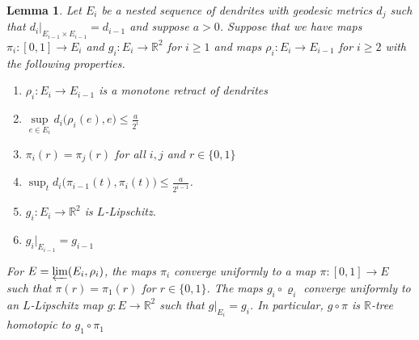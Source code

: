 \documentclass[10pt,a4paper]{amsart}
\newtheorem{lemma}{Lemma}
\begin{document}
\begin{lemma}\label{lem: limit is r-tree homotopic}
Let $E_i$ be a nested sequence of dendrites with geodesic metrics $d_j$ such that $d_{i}|_{E_{i-1}\times E_{i-1}} = d_{i-1}$ and suppose $a>0$. Suppose that we have maps $\pi_i:[0,1]\to E_i$ and $g_i: E_i\to \mathbb R^2$ for $i\geq 1$ and maps $\rho_i:E_i\to E_{i-1}$ for $i\geq 2$ with the following properties.

    \begin{enumerate}
        \item $\rho_i:E_i\to E_{i-1}$ is a monotone retract of dendrites
        \item $\sup\limits_{e\in E_i}d_i\big(\rho_i(e), e\big)\leq \frac{a}{2^i}$
        \item\label{fixed ends}$\pi_i(r) = \pi_j(r)$ for all $i,j$ and $r\in \{0,1\}$
        \item\label{cauchy} $\sup_t d_i\big(\pi_{i-1}(t), \pi_i(t)\big)\leq \frac{a}{2^{i-1}}$.
        \item $g_i: E_i\to \mathbb R^2$ is $L$-Lipschitz.
        \item $g_i|_{E_{i-1}} = g_{i-1}$
    \end{enumerate}

    For $E = \varprojlim(E_i, \rho_i)$,  the maps $\pi_i$ converge uniformly to a map $\pi: [0,1]\to E$ such that $\pi(r) = \pi_1(r)$ for $r\in \{0,1\}$.  The maps $g_i\circ\varrho_i$ converge uniformly to an $L$-Lipschitz map $g: E \to \mathbb R^2$ such that $g|_{E_i} = g_i$.  In particular, $g\circ\pi$ is $\mathbb R$-tree homotopic to $g_1\circ \pi_1$
\end{lemma}
\end{document}
